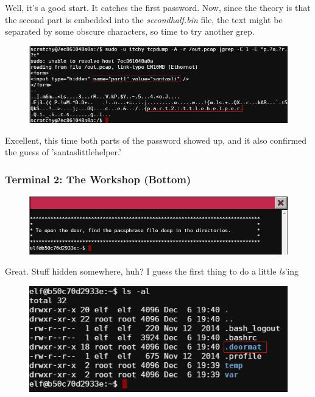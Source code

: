 \documentclass[writeup.tex]{subfiles}
\begin{document}
			Well, it's a good start. It catches the first password. Now, since the theory is that the second part is embedded into the \textit{secondhalf.bin} file, the text might be separated by some obscure characters, so time to try another grep.
			
			\begin{figure}[H]
				\centering
				\includegraphics[width=\linewidth]{"screenshots/terminals/Terminal 1 - tcpdump grep pt 2"}
			\end{figure}
			
			Excellent, this time both parts of the password showed up, and it also confirmed the guess of 'santaslittlehelper.'
			
		
		
		
		\subsubsection{Terminal 2: The Workshop (Bottom)} \label{terminal2}
			\begin{figure}[H]
				\centering
				\includegraphics[width=\linewidth]{"screenshots/terminals/Terminal 2 - First"}
			\end{figure}
			
			Great. Stuff hidden somewhere, huh? I guess the first thing to do a little \textit{ls}'ing
			\begin{figure}[H]
				\centering
				\includegraphics[scale=1]{"screenshots/terminals/Terminal 2 - ls -al"}
			\end{figure}
			
\end{document}
